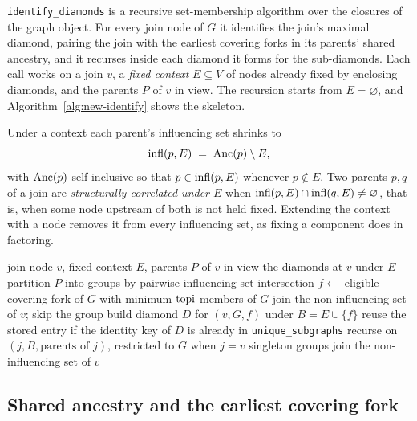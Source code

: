 \documentclass[12pt]{report}
\begin{document}
\texttt{identify\_diamonds} is a recursive set-membership algorithm over the closures of the graph object. For every join node of $G$ it identifies the join's maximal diamond, pairing the join with the earliest covering forks in its parents' shared ancestry, and it recurses inside each diamond it forms for the sub-diamonds. Each call works on a join $v$, a \emph{fixed context} $E \subseteq V$ of nodes already fixed by enclosing diamonds, and the parents $P$ of $v$ in view. The recursion starts from $E = \varnothing$, and Algorithm~\ref{alg:new-identify} shows the skeleton.

Under a context each parent's influencing set shrinks to
\[
\mathrm{infl}(p,E) \;=\; \mathrm{Anc}(p)\setminus E ,
\]
with $\mathrm{Anc}(p)$ self-inclusive so that $p \in \mathrm{infl}(p,E)$ whenever $p \notin E$. Two parents $p, q$ of a join are \emph{structurally correlated under $E$} when $\mathrm{infl}(p,E) \cap \mathrm{infl}(q,E) \neq \varnothing$, that is, when some node upstream of both is not held fixed. Extending the context with a node removes it from every influencing set, as fixing a component does in factoring.

\begin{algorithm}[htbp]
\caption{Recursive diamond identification (skeleton)}
\label{alg:new-identify}
\begin{algorithmic}[1]
\Require join node $v$, fixed context $E$, parents $P$ of $v$ in view
\Ensure the diamonds at $v$ under $E$
\State partition $P$ into groups by pairwise influencing-set intersection
    \State $f \gets$ eligible covering fork of $G$ with minimum $\mathrm{topi}$
        \State members of $G$ join the non-influencing set of $v$; skip the group
    \EndIf
    \State build diamond $D$ for $(v, G, f)$ under $B = E \cup \{f\}$
    \State reuse the stored entry if the identity key of $D$ is already in \texttt{unique\_subgraphs}
        \State recurse on $(j, B, \text{parents of } j)$, restricted to $G$ when $j = v$
    \EndFor
\EndFor
\State singleton groups join the non-influencing set of $v$
\end{algorithmic}
\end{algorithm}

\subsection{Shared ancestry and the earliest covering fork}
\label{sec:dd-partition}
\label{sec:dd-fork}
\end{document}
